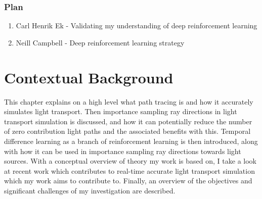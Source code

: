 \documentclass[ %
                    author={Callum Pearce},
                supervisor={Dr. Neill Campbell},
                    degree={MEng},
                     title={How effective are Temporal difference learning methods for reducing the number of zero contribution light paths while still accurately approximating Global Illumination in Path tracing?},
                  subtitle={},
                      type={research},
                      year={2019} ]{dissertation}
\begin{document}
\subsection{Plan}
\begin{enumerate}
\item Carl Henrik Ek - Validating my understanding of deep reinforcement learning
\item Neill Campbell - Deep reinforcement learning strategy
\end{enumerate}


%

\mainmatter


\chapter{Contextual Background}
\label{chap:context}


This chapter explains on a high level what path tracing is and how it accurately 
simulates light transport. Then importance sampling ray directions in light
transport simulation is discussed, and how it can potentially reduce the number 
of zero contribution light paths and the associated benefits with this. Temporal 
difference learning as a branch of reinforcement learning is then introduced, 
along with how it can be used in importance sampling ray directions towards 
light sources. With a conceptual overview of theory my work is based on, I take 
a look at recent work which contributes to real-time accurate light transport 
simulation which my work aims to contribute to. Finally, an overview of the 
objectives and significant challenges of my investigation are described.
\end{document}
